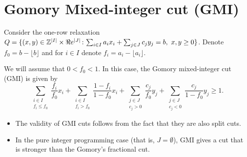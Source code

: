 \section{Gomory Mixed-integer cut (GMI)}
Consider the one-row relaxation $Q=\{(x,y)\in {\mathbb{Z}}^{|I|}\times \Re e^{|J|}{\,:\,} \sum_{i\in I}a_ix_i+\sum_{j\in J}c_jy_j= b,\ x,y\geq0\}$. Denote $f_0=b-\lfloor b\rfloor$ and for $i\in I$ denote $f_i=a_i-\lfloor a_i\rfloor$. 

We will assume that $0<f_0<1$. In this case, the Gomory mixed-integer cut (GMI) is given by
$$\sum_{\substack{i\in I\\f_i\leq f_0}}\frac{f_i}{f_0}x_i + \sum_{\substack{i\in I\\f_i> f_0}}\frac{1-f_i}{1-f_0}x_i+\sum_{\substack{j\in J\\c_j>0}}\frac{c_j}{f_0}y_j+\sum_{\substack{j\in J\\c_j<0}}\frac{c_j}{1-f_0}y_j\geq 1.$$

\begin{remark}
\text{ }
\begin{itemize}
	\item The validity of GMI cuts follows from the fact that they are also split cuts.
	\item In the pure integer programming case (that is, $J=\emptyset$), GMI gives a cut that is stronger than the Gomory's fractional cut.
\end{itemize}
\end{remark}





%
%
%

